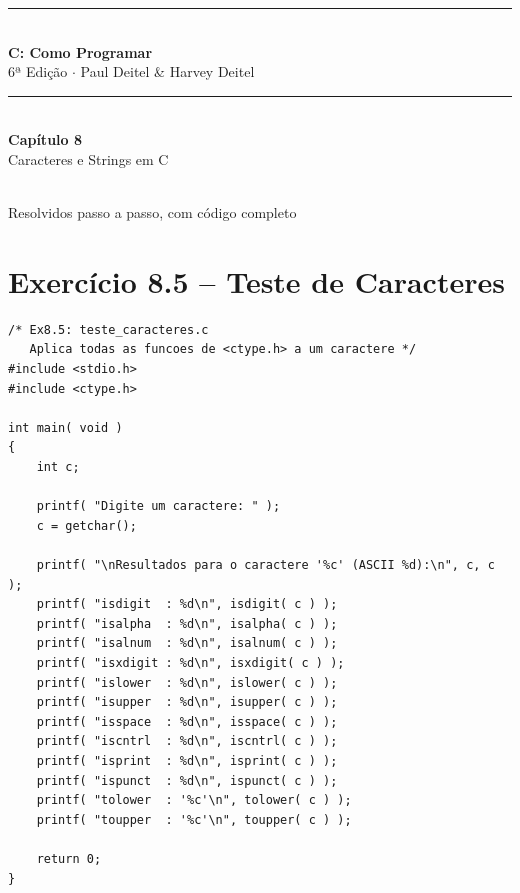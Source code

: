 \documentclass[12pt,a4paper]{article}
\begin{document}
\begin{titlepage}
  \centering\vspace*{2cm}
  {\color{deitelblue}\rule{\linewidth}{2pt}}\\[0.4cm]
  {\huge\bfseries\color{deitelblue}C: Como Programar}\\[0.2cm]
  {\large\color{deitelblue}6ª Edição $\cdot$ Paul Deitel \& Harvey Deitel}\\[0.2cm]
  {\color{deitelblue}\rule{\linewidth}{2pt}}\\[1cm]
  {\LARGE\bfseries Capítulo 8}\\[0.3cm]
  {\Large\color{deitelblue!80}Caracteres e Strings em C}\\[0.8cm]
  \begin{tcolorbox}[colback=deitellightblue,colframe=deitelblue,width=0.85\linewidth]
    \\[0.2cm]
    {\normalsize Resolvidos passo a passo, com código completo}
  \end{tcolorbox}
\end{titlepage}

\tableofcontents\newpage

\section{Exercício 8.5 -- Teste de Caracteres}

\begin{respostabox}
\begin{lstlisting}
/* Ex8.5: teste_caracteres.c
   Aplica todas as funcoes de <ctype.h> a um caractere */
#include <stdio.h>
#include <ctype.h>

int main( void )
{
    int c;

    printf( "Digite um caractere: " );
    c = getchar();

    printf( "\nResultados para o caractere '%c' (ASCII %d):\n", c, c );
    printf( "isdigit  : %d\n", isdigit( c ) );
    printf( "isalpha  : %d\n", isalpha( c ) );
    printf( "isalnum  : %d\n", isalnum( c ) );
    printf( "isxdigit : %d\n", isxdigit( c ) );
    printf( "islower  : %d\n", islower( c ) );
    printf( "isupper  : %d\n", isupper( c ) );
    printf( "isspace  : %d\n", isspace( c ) );
    printf( "iscntrl  : %d\n", iscntrl( c ) );
    printf( "isprint  : %d\n", isprint( c ) );
    printf( "ispunct  : %d\n", ispunct( c ) );
    printf( "tolower  : '%c'\n", tolower( c ) );
    printf( "toupper  : '%c'\n", toupper( c ) );

    return 0;
}
\end{lstlisting}
\end{respostabox}
\end{document}
